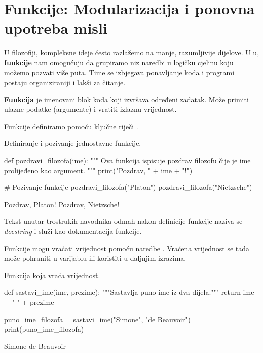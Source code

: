 \section{Funkcije: Modularizacija i ponovna upotreba misli}
\label{sec:funkcije}

U filozofiji, kompleksne ideje često razlažemo na manje, razumljivije dijelove. U u, \textbf{funkcije} nam omogućuju da grupiramo niz naredbi u logičku cjelinu koju možemo pozvati više puta. Time se izbjegava ponavljanje koda i programi postaju organiziraniji i lakši za čitanje.

\begin{definicijaokvir}
    \textbf{Funkcija} je imenovani blok koda koji izvršava određeni zadatak. Može primiti ulazne podatke (argumente) i vratiti izlaznu vrijednost.
\end{definicijaokvir}

Funkcije definiramo pomoću ključne riječi .

\begin{primjerokvir}
    Definiranje i pozivanje jednostavne funkcije.
    \begin{pythoncode}
def pozdravi_filozofa(ime):
    """
    Ova funkcija ispisuje pozdrav filozofu čije je ime
    prolijeđeno kao argument.
    """
    print("Pozdrav, " + ime + "!")

# Pozivanje funkcije
pozdravi_filozofa("Platon")
pozdravi_filozofa("Nietzsche")
    \end{pythoncode}
    \begin{codeoutput}
Pozdrav, Platon!
Pozdrav, Nietzsche!
    \end{codeoutput}
    Tekst unutar trostrukih navodnika odmah nakon definicije funkcije naziva se \textit{docstring} i služi kao dokumentacija funkcije.
\end{primjerokvir}

Funkcije mogu vraćati vrijednost pomoću naredbe . Vraćena vrijednost se tada može pohraniti u varijablu ili koristiti u daljnjim izrazima.

\begin{primjerokvir}
    Funkcija koja vraća vrijednost.
    \begin{pythoncode}
def sastavi_ime(ime, prezime):
    """Sastavlja puno ime iz dva dijela."""
    return ime + " " + prezime

puno_ime_filozofa = sastavi_ime("Simone", "de Beauvoir")
print(puno_ime_filozofa)
    \end{pythoncode}
    \begin{codeoutput}
Simone de Beauvoir
    \end{codeoutput}
\end{primjerokvir}

